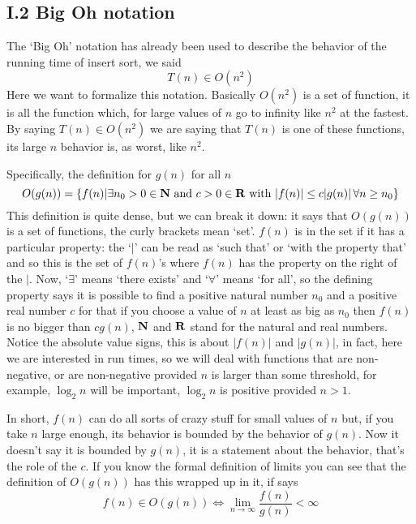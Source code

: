 \documentclass[11pt,a4paper]{scrartcl}
\begin{document}
\subsection*{I.2 Big Oh notation}

The \lq{}Big Oh\rq{} notation has already been used to describe the
behavior of the running time of insert sort, we said
\begin{equation}
T(n)\in O(n^2)
\end{equation}
Here we want to formalize this notation. Basically $O(n^2)$ is a set
of function, it is all the function which, for large values of $n$ go
to infinity like $n^2$ at the fastest. By saying $T(n)\in O(n^2)$ we
are saying that $T(n)$ is one of these functions, its large $n$
behavior is, as worst, like $n^2$. 

Specifically, the definition for $g(n)$ for all $n$
\begin{equation}
O(g(n))=\{f(n)| \exists n_0>0\in {\bf N}\mbox{ and }c>0\in {\bf R}\mbox{ with }|f(n)|\le c|g(n)|\,\forall n\ge n_0\}
\end{equation}
This definition is quite dense, but we can break it down: it says that
$O(g(n))$ is a set of functions, the curly brackets mean
\lq{}set\rq{}. $f(n)$ is in the set if it has a particular
property: the \lq$|$\rq{} can be read as \lq{}such that\rq{} or
\lq{}with the property that\rq{} and so this is the set of $f(n)$'s
where $f(n)$ has the property on the right of the $|$. Now,
\lq{}$\exists$\rq{} means \lq{}there exists\rq{} and
\lq{}$\forall$\rq{} means \lq{}for all\rq{}, so the defining property
says it is possible to find a positive natural number $n_0$ and a
positive real number $c$ for that if you choose a value of $n$ at
least as big as $n_0$ then $f(n)$ is no bigger than $cg(n)$, ${\bf N}$
and ${\bf R}$ stand for the natural and real numbers. Notice the
absolute value signs, this is about $|f(n)|$ and $|g(n)|$, in fact,
here we are interested in run times, so we will deal with functions
that are non-negative, or are non-negative provided $n$ is larger than
some threshold, for example, $\log_2{n}$ will be important,
$\log_2{n}$ is positive provided $n>1$.

In short, $f(n)$ can do all sorts of crazy stuff for small values of
$n$ but, if you take $n$ large enough, its behavior is bounded by the
behavior of $g(n)$. Now it doesn't say it is bounded by $g(n)$, it is
a statement about the behavior, that's the role of the $c$. If you
know the formal definition of limits you can see that the definition
of $O(g(n))$ has this wrapped up in it, if says
\begin{equation}
f(n)\in O(g(n))\iff \lim_{n\rightarrow \infty}\frac{f(n)}{g(n)}<\infty
\end{equation}
\end{document}
